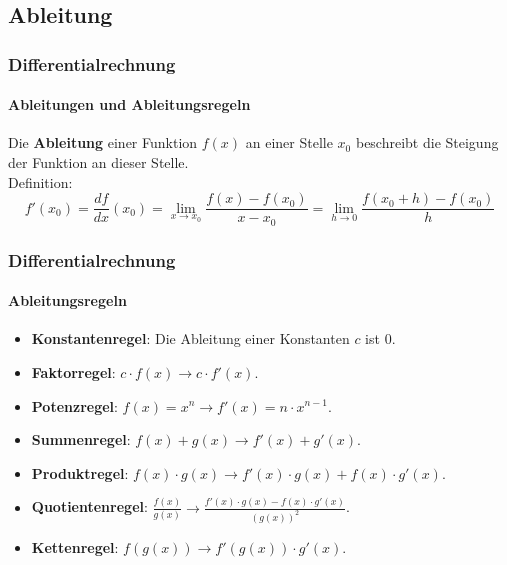 \documentclass{beamer}
\begin{document}
\subsection{Ableitung}
\begin{frame}
  \frametitle{Differentialrechnung}
  \framesubtitle{Ableitungen und Ableitungsregeln}


Die \textbf{Ableitung} einer Funktion $f(x)$ an einer Stelle $x_0$ beschreibt die Steigung der Funktion an dieser Stelle.\\

Definition: $$f'(x_0)=\frac{df}{dx}(x_0)=\lim_{x \to x_0} \frac{f(x)-f(x_0)}{x - x_0}=\lim_{h \to 0}\frac{f(x_0+h)-f(x_0)}{h}$$
\begin{center}
\end{center}   
\end{frame}

\begin{frame}
  \frametitle{Differentialrechnung}
  \framesubtitle{Ableitungsregeln}

  \begin{itemize}
    \item \textbf{Konstantenregel}: Die Ableitung einer Konstanten $c$ ist $0$.
    \item \textbf{Faktorregel}: $c\cdot f(x) \longrightarrow c \cdot f'(x)$.
    \item \textbf{Potenzregel}: $f(x) = x^n \longrightarrow f'(x) = n \cdot x^{n-1}$.
    \item \textbf{Summenregel}: $f(x) + g(x) \longrightarrow f'(x) + g'(x)$.
    \item \textbf{Produktregel}: $f(x) \cdot g(x) \longrightarrow f'(x) \cdot g(x) + f(x) \cdot g'(x)$.
    \item \textbf{Quotientenregel}:  $\frac{f(x)}{g(x)} \longrightarrow \frac{f'(x) \cdot g(x) - f(x) \cdot g'(x)}{(g(x))^2}$.
    \item \textbf{Kettenregel}:  $f(g(x)) \longrightarrow f'(g(x)) \cdot g'(x)$.
  \end{itemize}
\end{frame}
\end{document}

